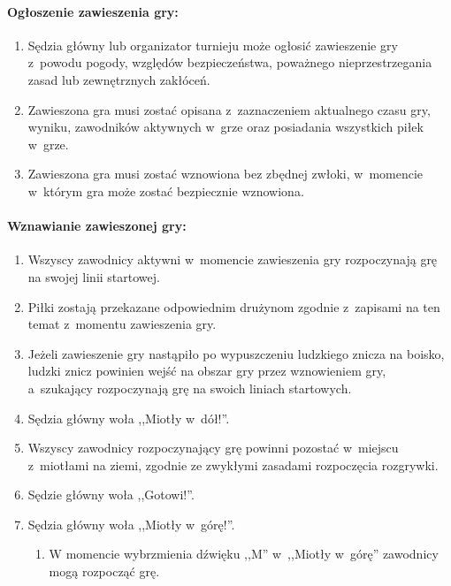 \documentclass[12pt,a4paper]{article}
\begin{document}
\paragraph{Ogłoszenie zawieszenia gry:}

\begin{enumerate}
	\item
	      Sędzia główny lub organizator turnieju może ogłosić zawieszenie gry z~powodu pogody, względów bezpieczeństwa, poważnego nieprzestrzegania
	      zasad lub zewnętrznych zakłóceń.
	\item
	      Zawieszona gra musi zostać opisana z~zaznaczeniem aktualnego czasu
	      gry, wyniku, zawodników aktywnych w~grze oraz posiadania wszystkich
	      piłek w~grze.
	\item
	      Zawieszona gra musi zostać wznowiona bez zbędnej zwłoki, w~momencie w~którym gra może zostać bezpiecznie wznowiona.
\end{enumerate}

\paragraph{Wznawianie zawieszonej gry:}

\begin{enumerate}
	\item
	      Wszyscy zawodnicy aktywni w~momencie zawieszenia gry rozpoczynają grę
	      na swojej linii startowej.
	\item
	      Piłki zostają przekazane odpowiednim drużynom zgodnie z~zapisami na
	      ten temat z~momentu zawieszenia gry.
	\item
	      Jeżeli zawieszenie gry nastąpiło po wypuszczeniu ludzkiego znicza na
	      boisko, ludzki znicz powinien wejść na obszar gry przez wznowieniem
	      gry, a~szukający rozpoczynają grę na swoich liniach startowych.
	\item
	      Sędzia główny woła ,,Miotły w~dół!''.
	\item
	      Wszyscy zawodnicy rozpoczynający grę powinni pozostać w~miejscu z~miotłami na ziemi, zgodnie ze zwykłymi zasadami rozpoczęcia rozgrywki.
	\item
	      Sędzie główny woła ,,Gotowi!''.
	\item
	      Sędzia główny woła ,,Miotły w~górę!''.

	      \begin{enumerate}
		      \item
		            W momencie wybrzmienia dźwięku ,,M'' w~,,Miotły w~górę'' zawodnicy
		            mogą rozpocząć grę.
	      \end{enumerate}
\end{enumerate}
\end{document}

